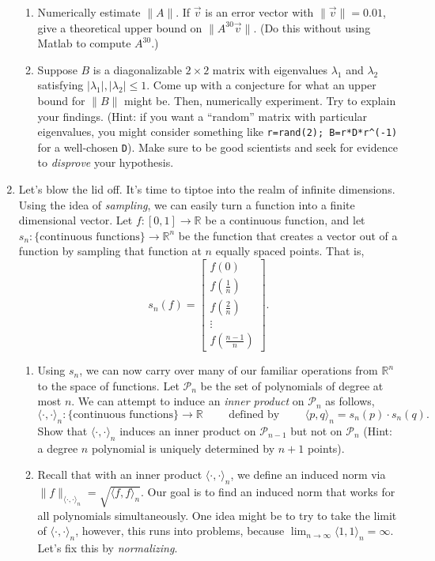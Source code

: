 \documentclass[letter]{article}
\newcommand{\R}{\mathbb{R}}
\newcommand{\mat}[1]{\begin{bmatrix}#1\end{bmatrix}}
\begin{document}
\begin{enumerate}
\begin{enumerate}
				\item Numerically estimate $\|A\|$. 
					If $\vec v$ is an error vector with $\|\vec v\|=0.01$, give a theoretical
					upper bound on $\|A^{30}\vec v\|$.  (Do this without using Matlab to compute $A^{30}$.)
				\item Suppose $B$ is a diagonalizable $2\times 2$ matrix with eigenvalues
					$\lambda_1$ and $\lambda_2$ satisfying $|\lambda_1|,|\lambda_2|\leq 1$.
					Come up with a conjecture for what an upper bound for $\|B\|$ might be.
					Then, numerically experiment.  Try to explain your findings.  (Hint:
					if you want a ``random'' matrix with particular eigenvalues,
					you might consider something like {\tt r=rand(2); B=r*D*r\textasciicircum(-1)}
					for a well-chosen {\tt D}).  Make sure to be good scientists and
					seek for evidence to \emph{disprove} your hypothesis. 
			\end{enumerate}
		\item {\sc Let's blow the lid off}.  It's time to tiptoe into the realm of infinite
			dimensions.  Using the idea of \emph{sampling}, we can easily turn a function
					into a finite dimensional vector.  Let $f:[0,1]\to\R$ be a continuous
					function, and let $s_n:\{\text{continuous functions}\}\to\R^n$
					be the function that creates a vector out of a function by sampling
					that function at $n$ equally spaced points.  That is,
					\[
						s_n(f) = \mat{f(0)\\[2pt]f(\frac{1}{n})\\[2pt]f(\frac{2}{n})\\\vdots\\f(\frac{n-1}{n})}.
					\]
			\begin{enumerate}
				\item Using $s_n$, we can now carry over many of our familiar operations from $\R^n$ to 
					the space of functions.  Let $\mathcal P_n$ be the set of polynomials of degree at most $n$.
					We can attempt to induce an \emph{inner product} on $\mathcal P_n$ as follows,
					\[
						\langle\cdot,\cdot\rangle_n:\{\text{continuous functions}\}\to \R\qquad\text{ defined by }\qquad
						\langle p,q\rangle_n = s_n(p)\cdot s_n(q).
					\]
					Show that $\langle \cdot,\cdot\rangle_n$ induces an inner product on $\mathcal P_{n-1}$ but
					not on $\mathcal P_n$ (Hint: a degree $n$ polynomial is uniquely determined by $n+1$ points).
				\item Recall that with an inner product $\langle\cdot,\cdot\rangle_n$, we define an induced norm
					via $\|f\|_{\langle\cdot,\cdot\rangle_n}=\sqrt{\langle f, f\rangle_n}$.  Our goal
					is to find an induced norm that works for all polynomials simultaneously.  One idea might
					be to try to take the limit of $\langle\cdot,\cdot\rangle_n$, however, this runs into problems,
					because $\lim_{n\to\infty} \langle 1,1\rangle_n=\infty$.  Let's fix this by \emph{normalizing}.


\end{enumerate}
\end{enumerate}
\end{document}
